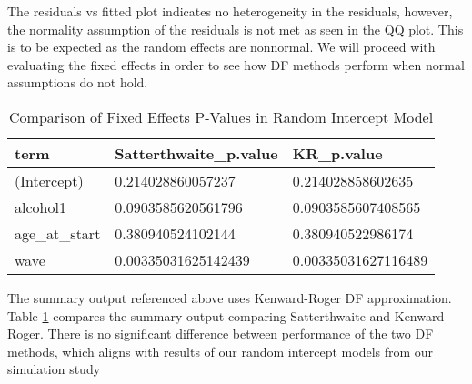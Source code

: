 \documentclass[12pt, twoside]{amherstthesis}
\begin{document}
The residuals vs fitted plot indicates no heterogeneity in the residuals, however, the normality assumption of the residuals is not met as seen in the QQ plot. This is to be expected as the random effects are nonnormal. We will proceed with evaluating the fixed effects in order to see how DF methods perform when normal assumptions do not hold.
\begin{table}[H]

\caption{\label{tab:compareintercept}Comparison of Fixed Effects P-Values in Random Intercept Model}
\centering
\begin{tabular}[t]{l|l|l}
\hline
term & Satterthwaite\_p.value & KR\_p.value\\
\hline
(Intercept) & 0.214028860057237 & 0.214028858602635\\
\hline
alcohol1 & 0.0903585620561796 & 0.0903585607408565\\
\hline
age\_at\_start & 0.380940524102144 & 0.380940522986174\\
\hline
wave & 0.00335031625142439 & 0.00335031627116489\\
\hline
\end{tabular}
\end{table}
The summary output referenced above uses Kenward-Roger DF approximation. Table \ref{tab:compareintercept} compares the summary output comparing Satterthwaite and Kenward-Roger. There is no significant difference between performance of the two DF methods, which aligns with results of our random intercept models from our simulation study
\end{document}

